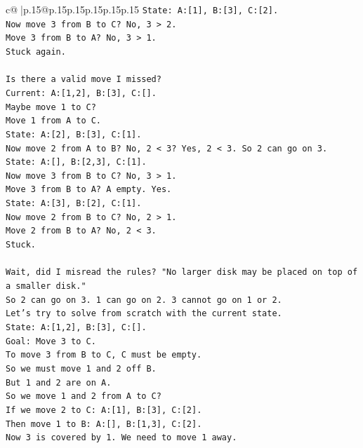 \documentclass{article}
\begin{document}
{\begin{supertabular}{c@{$\;$}|p{.15\linewidth}@{}p{.15\linewidth}p{.15\linewidth}p{.15\linewidth}p{.15\linewidth}p{.15\linewidth}}
{{{\texttt{State: A:{[}1{]}, B:{[}3{]}, C:{[}2{]}.} \\
\texttt{Now move 3 from B to C? No, 3 > 2.} \\
\texttt{Move 3 from B to A? No, 3 > 1.} \\
\texttt{Stuck again.} \\
\\ 
\texttt{Is there a valid move I missed?} \\
\texttt{Current: A:{[}1,2{]}, B:{[}3{]}, C:{[}{]}.} \\
\texttt{Maybe move 1 to C?} \\
\texttt{Move 1 from A to C.} \\
\texttt{State: A:{[}2{]}, B:{[}3{]}, C:{[}1{]}.} \\
\texttt{Now move 2 from A to B? No, 2 < 3? Yes, 2 < 3. So 2 can go on 3.} \\
\texttt{State: A:{[}{]}, B:{[}2,3{]}, C:{[}1{]}.} \\
\texttt{Now move 3 from B to C? No, 3 > 1.} \\
\texttt{Move 3 from B to A? A empty. Yes.} \\
\texttt{State: A:{[}3{]}, B:{[}2{]}, C:{[}1{]}.} \\
\texttt{Now move 2 from B to C? No, 2 > 1.} \\
\texttt{Move 2 from B to A? No, 2 < 3.} \\
\texttt{Stuck.} \\
\\ 
\texttt{Wait, did I misread the rules? "No larger disk may be placed on top of a smaller disk."} \\
\texttt{So 2 can go on 3. 1 can go on 2. 3 cannot go on 1 or 2.} \\
\texttt{Let's try to solve from scratch with the current state.} \\
\texttt{State: A:{[}1,2{]}, B:{[}3{]}, C:{[}{]}.} \\
\texttt{Goal: Move 3 to C.} \\
\texttt{To move 3 from B to C, C must be empty.} \\
\texttt{So we must move 1 and 2 off B.} \\
\texttt{But 1 and 2 are on A.} \\
\texttt{So we move 1 and 2 from A to C?} \\
\texttt{If we move 2 to C: A:{[}1{]}, B:{[}3{]}, C:{[}2{]}.} \\
\texttt{Then move 1 to B: A:{[}{]}, B:{[}1,3{]}, C:{[}2{]}.} \\
\texttt{Now 3 is covered by 1. We need to move 1 away.} \\
}}}
\end{supertabular}}
\end{document}
